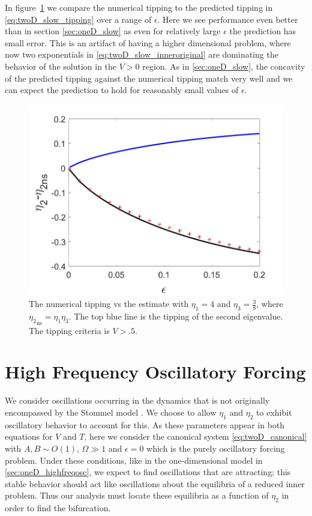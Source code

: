 In figure~\ref{fig:twoD_slow_epscomp} we compare the numerical tipping to the predicted tipping in \eqref{eq:twoD_slow_tipping} over a range of $\epsilon$. Here we see performance even better than in section \autoref{sec:oneD_slow} as even for relatively large $\epsilon$ the prediction has small error. This is an artifact of having a higher dimensional problem, where now two exponentials in \eqref{eq:twoD_slow_inneroriginal} are dominating the behavior of the solution in the $V>0$ region. As in \autoref{sec:oneD_slow}, the concavity of the predicted tipping against the numerical tipping match very well and we can expect the prediction to hold for reasonably small values of $\epsilon$.

\begin{figure}[H]
\centering
\includegraphics[width=\linewidth]{twoD/slow_epscomp.jpg}
\caption{The numerical tipping vs the estimate with $\eta_1=4$ and $\eta_3=\frac{3}{8}$, where ${\eta_2}_{\text{ns}}=\eta_1\eta_3$. The top blue line is the tipping of the second eigenvalue. The tipping criteria is $V>.5$.}
\label{fig:twoD_slow_epscomp}
\end{figure}

\section{High Frequency Oscillatory Forcing}
\label{sec:twoD_highfreqosc}

We consider oscillations occurring in the dynamics that is not originally encompassed by the Stommel model \cite{alley2003abrupt,huybers2005obliquity,marotzke2000abrupt,rahmstorf2000thermohaline,rahmstorf2002ocean,stastna2007box}. We choose to allow $\eta_1$ and $\eta_2$ to exhibit oscillatory behavior to account for this. As these parameters appear in both equations for $V$ and $T$, here we consider the canonical system \eqref{eq:twoD_canonical} with $A,B\sim O(1)$, $\Omega\gg 1$ and $\epsilon=0$ which is the purely oscillatory forcing problem. Under these conditions, like in the one-dimensional model in \autoref{sec:oneD_highfreqosc}, we expect to find oscillations that are attracting; this stable behavior should act like oscillations about the equilibria of a reduced inner problem. Thus our analysis must locate these equilibria as a function of $\eta_2$ in order to find the bifurcation.

